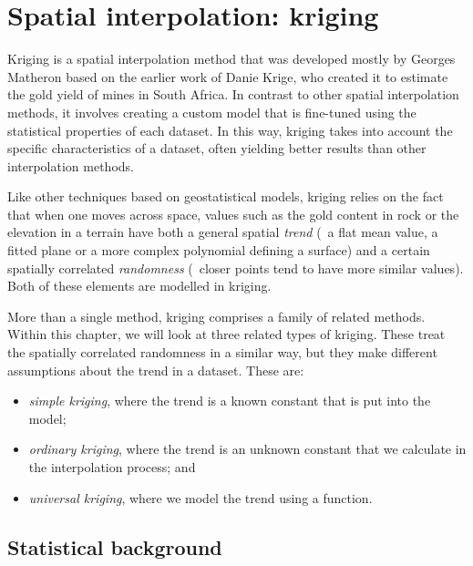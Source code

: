 
\setchapterpreamble[u]{\margintoc}


\graphicspath{{kriging/}}

\chapter{Spatial interpolation: kriging}%
\label{chap:kriging}

Kriging is a spatial interpolation method that was developed mostly by Georges Matheron based on the earlier work of Danie Krige, who created it to estimate the gold yield of mines in South Africa.
In contrast to other spatial interpolation methods, it involves creating a custom model that is fine-tuned using the statistical properties of each dataset.
In this way, kriging takes into account the specific characteristics of a dataset, often yielding better results than other interpolation methods.

Like other techniques based on geostatistical models, kriging relies on the fact that when one moves across space, values such as the gold content in rock or the elevation in a terrain have both a general spatial \emph{trend} (\eg\ a flat mean value, a fitted plane or a more complex polynomial defining a surface) and a certain spatially correlated \emph{randomness} (\ie\ closer points tend to have more similar values).
Both of these elements are modelled in kriging.

More than a single method, kriging comprises a family of related methods.
Within this chapter, we will look at three related types of kriging.
These treat the spatially correlated randomness in a similar way, but they make different assumptions about the trend in a dataset.
These are:
\begin{itemize}
\item \emph{simple kriging}, where the trend is a known constant that is put into the model;
\item \emph{ordinary kriging}, where the trend is an unknown constant that we calculate in the interpolation process; and
\item \emph{universal kriging}, where we model the trend using a function.
\end{itemize}

\section{Statistical background}

